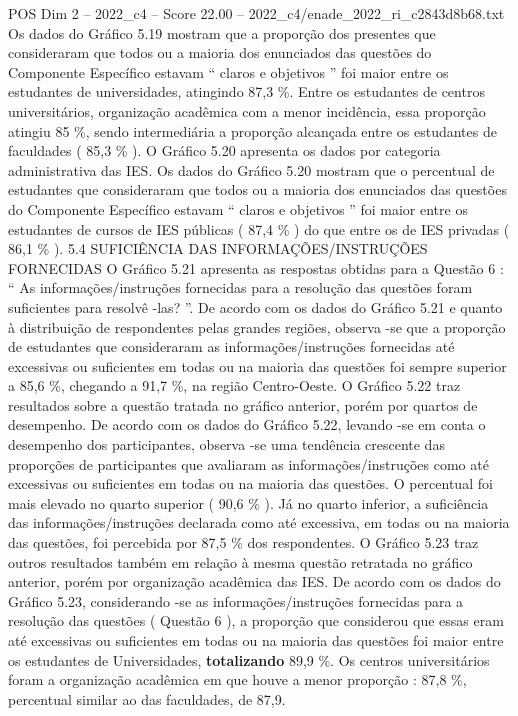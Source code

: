 \begin{textsample}{POS Dim 2 – 2022\_c4 – Score 22.00 – 2022\_c4/enade\_2022\_ri\_c2843d8b68.txt}
Os dados do Gráfico 5.19 mostram que a proporção dos presentes que consideraram que todos ou a maioria dos enunciados das questões do Componente Específico estavam “ claros e objetivos ” foi maior entre os estudantes de universidades, atingindo 87,3 \%.
Entre os estudantes de centros universitários, organização acadêmica com a menor incidência, essa proporção atingiu 85 \%, sendo intermediária a proporção alcançada entre os estudantes de faculdades ( 85,3 \% ).
O Gráfico 5.20 apresenta os dados por categoria administrativa das IES.
Os dados do Gráfico 5.20 mostram que o percentual de estudantes que consideraram que todos ou a maioria dos enunciados das questões do Componente Específico estavam “ claros e objetivos ” foi maior entre os estudantes de cursos de IES públicas ( 87,4 \% ) do que entre os de IES privadas ( 86,1 \% ). 5.4 SUFICIÊNCIA DAS INFORMAÇÕES/INSTRUÇÕES FORNECIDAS O Gráfico 5.21 apresenta as respostas obtidas para a Questão 6 : “ As informações/instruções fornecidas para a resolução das questões foram suficientes para resolvê -las? ”.
De acordo com os dados do Gráfico 5.21 e quanto à distribuição de respondentes pelas grandes regiões, observa -se que a proporção de estudantes que consideraram as informações/instruções fornecidas até excessivas ou suficientes em todas ou na maioria das questões foi sempre superior a 85,6 \%, chegando a 91,7 \%, na região Centro-Oeste.
O Gráfico 5.22 traz resultados sobre a questão tratada no gráfico anterior, porém por quartos de desempenho.
De acordo com os dados do Gráfico 5.22, levando -se em conta o desempenho dos participantes, observa -se uma tendência crescente das proporções de participantes que avaliaram as informações/instruções como até excessivas ou suficientes em todas ou na maioria das questões.
O percentual foi mais elevado no quarto superior ( 90,6 \% ).
Já no quarto inferior, a suficiência das informações/instruções declarada como até excessiva, em todas ou na maioria das questões, foi percebida por 87,5 \% dos respondentes.
O Gráfico 5.23 traz outros resultados também em relação à mesma questão retratada no gráfico anterior, porém por organização acadêmica das IES.
De acordo com os dados do Gráfico 5.23, considerando -se as informações/instruções fornecidas para a resolução das questões ( Questão 6 ), a proporção que considerou que essas eram até excessivas ou suficientes em todas ou na maioria das questões foi maior entre os estudantes de Universidades, \textbf{totalizando} 89,9 \%.
Os centros universitários foram a organização acadêmica em que houve a menor proporção : 87,8 \%, percentual similar ao das faculdades, de 87,9.

\end{textsample}

